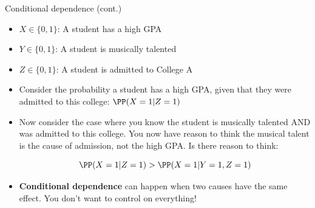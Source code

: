 \documentclass[compress, 8pt]{beamer}
\begin{document}
\begin{frame}{Conditional dependence (cont.)}

\begin{itemize}
    \item $X \in \{0, 1\}$: A student has a high GPA
    \item $Y \in \{0, 1\}$: A student is musically talented
    \item $Z \in \{0, 1\}$: A student is admitted to College A
\end{itemize}
\begin{figure}
\end{figure}

\begin{itemize}
    \item Consider the probability a student has a high GPA, given that they were admitted to this college: $\PP (X = 1 \vert Z = 1)$
    \item Now consider the case where you know the student is musically talented AND was admitted to this college. You now have reason to think the musical talent is the cause of admission, not the high GPA. Is there reason to think:

    \begin{equation*}
    \PP (X =1 \vert Z=1) > \PP (X=1 \vert Y=1, Z=1)
    \end{equation*}

    \item \textbf{Conditional dependence} can happen when two causes have the same effect. You don't want to control on everything!
\end{itemize}




\end{frame}
\end{document}
